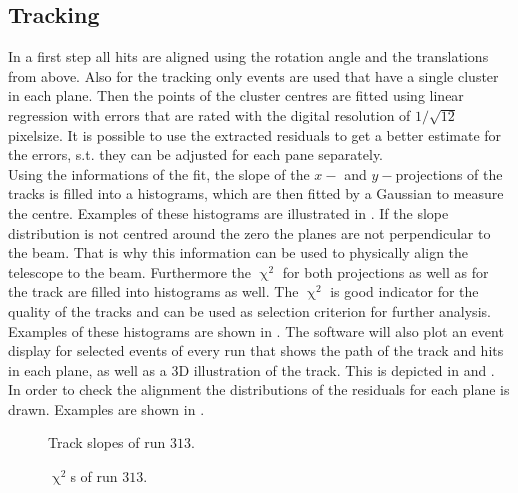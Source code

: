 \subsection{Tracking}
In a first step all hits are aligned using the rotation angle and the translations from above. Also for the tracking only events are used that have a single cluster in each plane. Then the points of the cluster centres are fitted using linear regression with errors that are rated with the digital resolution of $1/\sqrt{12}\,$pixelsize. It is possible to use the extracted residuals to get a better estimate for the errors, s.t. they can be adjusted for each pane separately.\\
Using the informations of the fit, the slope of the $x-$ and $y-$projections of the tracks is filled into a histograms, which are then fitted by a Gaussian to measure the centre. Examples of these histograms are illustrated in . If the slope distribution is not centred around the zero the planes are not perpendicular to the beam. That is why this information can be used to physically align the telescope to the beam. Furthermore the $\upchi^{2}$ for both projections as well as for the track are filled into histograms as well. The $\upchi^{2}$ is good indicator for the quality of the tracks and can be used as selection criterion for further analysis. Examples of these histograms are shown in .
The software will also plot an event display for selected events of every run that shows the path of the track and hits in each plane, as well as a 3D illustration of the track. This is depicted in  and .\\
In order to check the alignment the distributions of the residuals for each plane is drawn. Examples are shown in .
\begin{figure}[ht]
	\centering
	\hfill
	\caption{Track slopes of run $313$.}
	\label{pslope}
\end{figure}\no
\begin{figure}[ht]
	\centering
	\hfill
	\hfill
	\caption{$\upchi^{2}$s of run $313$.}
	\label{pchi}
\end{figure}\no
